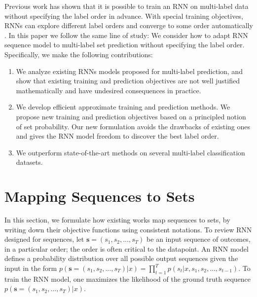 Previous work has shown that it is possible to train an RNN on multi-label data without specifying the label order in advance. With special training objectives, RNNs can explore different label orders and converge to some order automatically \cite{vinyals2015order}. In this paper we follow the same line of study: We consider how to adapt RNN sequence model to multi-label set prediction without specifying the label order. Specifically, we make the following  contributions:
\begin{enumerate}
\item We analyze existing RNNs models proposed for multi-label prediction, and show that existing training and prediction objectives are not well justified mathematically and have undesired consequences in practice. 
\item  We develop efficient approximate training and prediction methods. We propose new training and prediction objectives based on a principled notion of set probability. Our new formulation avoids the drawbacks of existing ones and gives  the  RNN  model  freedom  to discover the best label order. 
\item We outperform state-of-the-art methods on several multi-label classification datasets.
\end{enumerate}

\section{Mapping Sequences to Sets} 
In this section, we formulate how existing works map sequences to sets, by writing down their objective functions using consistent notations. To review RNN designed for sequences, let $\mathbf{s}=(s_1,s_2,...,s_T)$ be an input sequence of outcomes, in a particular order; the order is often critical to the datapoint. An RNN model defines a probability distribution over all possible output sequences given the input in the form $p(\mathbf{s}=(s_1,s_2,...,s_T)|x)=\prod_{t=1}^T p(s_t|x,s_1,s_2,...,s_{t-1})$. To train the RNN model, one maximizes the likelihood of the ground truth sequence $p(\mathbf{s}=(s_1,s_2,...,s_T)|x)$.

